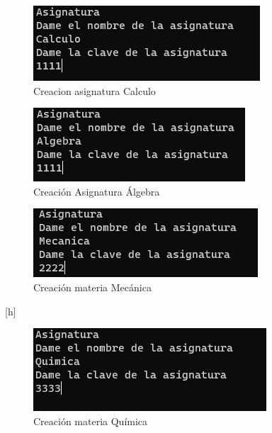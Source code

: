 \documentclass{report}
\begin{document}
\begin{figure}[h]
    \centering
    \includegraphics[width=1\linewidth]{Imagen11.png}
    \caption{Creacion asignatura Calculo}
    
\end{figure}
\begin{figure}
    \centering
    \includegraphics[width=1\linewidth]{Imagen12.png}
    \caption{Creación Asignatura Álgebra}
    
\end{figure}
\begin{figure}
    \centering
    \includegraphics[width=1\linewidth]{Imagen13.png}
    \caption{Creación materia Mecánica}
    
\end{figure}[h]
\begin{figure}
    \centering
    \includegraphics[width=1\linewidth]{Imagen14.png}
    \caption{Creación materia Química}
    
\end{figure}
\end{document}
